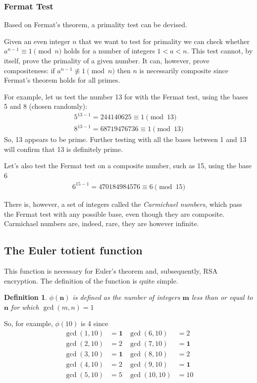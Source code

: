 \documentclass[12pt, titlepage]{article}
\newtheorem*{definition}{Definition}
\begin{document}
    \subsubsection{Fermat Test}
        Based on Fermat's theorem, a primality test can be devised.

        Given an even integer $n$ that we want to test for primality we can check whether
        $a^{n-1} \equiv 1 \pmod{n}$ holds for a number of integers $1<a<n$.  This test cannot,
        by itself, prove the primality of a given number. It can, however, prove compositeness:
        if $a^{n-1} \not\equiv 1 \pmod{n}$ then $n$ is necessarily composite since Fermat's
        theorem holds for all primes. \cite{primality_akalin}

        For example, let us test the number 13 for with the Fermat test, using the bases 5 and 8
        (chosen randomly):
        \begin{align*}
            5^{13-1} = 244140625   \equiv 1 \pmod{13}\\
            8^{13-1} = 68719476736 \equiv 1 \pmod{13}
        \end{align*}
        So, 13 appears to be prime. Further testing with all the bases between 1 and 13 will
        confirm that 13 is definitely prime.

        Let's also test the Fermat test on a composite number, such as 15, using the base 6
        \begin{align*}
            6^{15-1} = 470184984576 \equiv 6 \pmod{15}
        \end{align*}

        There is, however, a set of integers called the \emph{Carmichael numbers}, which pass
        the Fermat test with any possible base, even though they are composite. Carmichael
        numbers are, indeed, rare, they are however infinite. \autocite[116]{dence}
    
    \subsection{The Euler totient function}
    This function is necessary for Euler's theorem and, subsequently, RSA encryption. The
    definition of the function is quite simple.
    \begin{definition}
        $\phi(\mathbf{n})$ is defined as the \emph{number} of integers $\mathbf{m}$ less than or
        equal to $\mathbf{n}$ for which $\gcd(m, n) = 1$
    \end{definition}
    So, for example, $\phi(10)$ is 4 since 
    \begin{align*}
        \gcd(1, 10) &= \mathbf{1} &\gcd(6, 10) &= 2\\
        \gcd(2, 10) &= 2          &\gcd(7, 10) &= \mathbf{1}\\
        \gcd(3, 10) &= \mathbf{1} &\gcd(8, 10) &= 2\\
        \gcd(4, 10) &= 2          &\gcd(9, 10) &= \mathbf{1}\\
        \gcd(5, 10) &= 5          &\gcd(10, 10) &= 10
    \end{align*}
\end{document}
